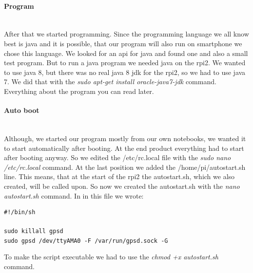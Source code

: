 \paragraph{Program} \mbox{}\\
After that we started programming. Since the programming language we all know best is java and it is possible, that our program will also run on smartphone we chose this language. \newline
We looked for an api for java and found one and also a small test program. \newline
But to run a java program we needed java on the \gls{rpi2}. We wanted to use java 8, but there was no real java 8 jdk for the \gls{rpi2}, so we had to use java 7. We did that with the \textit{sudo apt-get install oracle-java7-jdk} command.\newline
Everything about the program you can read later.

\paragraph{Auto boot} \mbox{}\\
Although, we started our program mostly from our own notebooks, we wanted it to start automatically after booting. At the end product everything had to start after booting anyway. So we edited the /etc/rc.local file with the \textit{sudo nano /etc/rc.local} command. At the last position we added the /home/pi/autostart.sh line.\newline
This means, that at the start of the \gls{rpi2} the autostart.sh, which we also created, will be called upon. So now we created the autostart.sh with the \textit{nano autostart.sh} command. In in this file we wrote:
\begin{verbatim}
#!/bin/sh

sudo killall gpsd
sudo gpsd /dev/ttyAMA0 -F /var/run/gpsd.sock -G
\end{verbatim}
To make the script executable we had to use the \textit{chmod +x autostart.sh} command.

